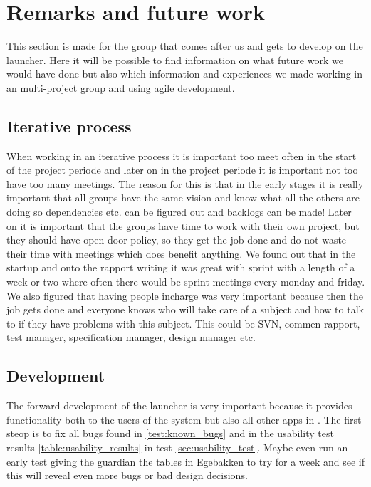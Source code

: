 \section{Remarks and future work}
\label{epi:remarks}
This section is made for the group that comes after us and gets to develop on the launcher. Here it will be possible to find information on what future work we would have done but also which information and experiences we made working in an multi-project group and using agile development.

\subsection{Iterative process}
\label{epi:iterative_process}
When working in an iterative process it is important too meet often in the start of the project periode and later on in the project periode it is important not too have too many meetings. The reason for this is that in the early stages it is really important that all groups have the same vision and know what all the others are doing so dependencies etc. can be figured out and backlogs can be made! Later on it is important that the groups have time to work with their own project, but they should have open door policy, so they get the job done and do not waste their time with meetings which does benefit anything.
We found out that in the startup and onto the rapport writing it was great with sprint with a length of a week or two where often there would be sprint meetings every monday and friday.
We also figured that having people incharge was very important because then the job gets done and everyone knows who will take care of a subject and how to talk to if they have problems with this subject. This could be SVN, commen rapport, test manager, specification manager, design manager etc.

\subsection{Development}
\label{epi:development}
The forward development of the launcher is very important because it provides functionality both to the users of the \giraf[] system but also all other apps in \giraf[].
The first steop is to fix all bugs found in \autoref{test:known_bugs} and in the usability test results \autoref{table:usability_results} in test \autoref{sec:usability_test}. Maybe even run an early test giving the guardian the tables in Egebakken to try for a week and see if this will reveal even more bugs or bad design decisions.

